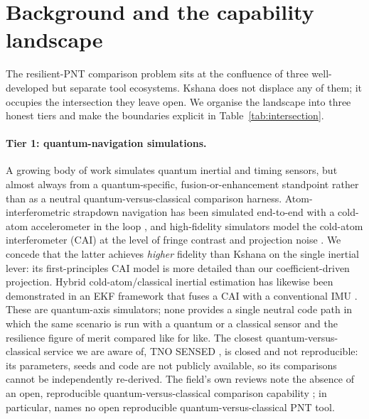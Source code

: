 \section{Background and the capability landscape}\label{sec:related}

The resilient-PNT comparison problem sits at the confluence of three well-developed
but separate tool ecosystems. Kshana does not displace any of them; it occupies the
intersection they leave open. We organise the landscape into three honest tiers and
make the boundaries explicit in Table~\ref{tab:intersection}.

\paragraph{Tier 1: quantum-navigation simulations.}
A growing body of work simulates quantum inertial and timing sensors, but almost
always from a quantum-specific, fusion-or-enhancement standpoint rather than as a
neutral quantum-versus-classical comparison harness. Atom-interferometric strapdown
navigation has been simulated end-to-end with a cold-atom accelerometer in the loop
\citep{atomstrapdown2023}, and high-fidelity simulators model the cold-atom
interferometer (CAI) at the level of fringe contrast and projection noise
\citep{quantumnav2025highfidelity}. We concede that the latter achieves
\emph{higher} fidelity than Kshana on the single inertial lever: its first-principles
CAI model is more detailed than our coefficient-driven projection. Hybrid
cold-atom/classical inertial estimation has likewise been demonstrated in an EKF
framework that fuses a CAI with a conventional IMU \citep{hybridcai2018}. These are
quantum-axis simulators; none provides a single neutral code path in which the same
scenario is run with a quantum or a classical sensor and the resilience figure of
merit compared like for like. The closest quantum-versus-classical service we are
aware of, TNO SENSED \citep{tno_sensed}, is closed and not reproducible: its
parameters, seeds and code are not publicly available, so its comparisons cannot be
independently re-derived. The field's own reviews note the absence of an open,
reproducible quantum-versus-classical comparison capability
\citep{coldatomnavreview2022,quantumpntreview2026}; in particular,
\citet{quantumpntreview2026} names no open reproducible quantum-versus-classical
PNT tool.

